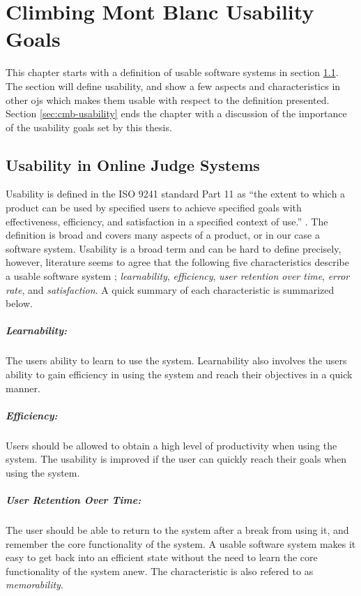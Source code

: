 \chapter{Climbing Mont Blanc Usability Goals}
\label{ch:design}
This chapter starts with a definition of usable software systems in section \ref{sec:usability-def}. The section will define usability, and show a few aspects and characteristics in other \glspl{oj} which makes them usable with respect to the definition presented. Section \ref{sec:cmb-usability} ends the chapter with a discussion of the importance of the usability goals set by this thesis.

\section{Usability in Online Judge Systems}
\label{sec:usability-def}
Usability is defined in the ISO 9241 standard Part 11 as ``the extent to which a product can be used by specified users to achieve specified goals with effectiveness, efficiency, and satisfaction in a specified context of use.'' \cite{ISO1998}. The definition is broad and covers many aspects of a product, or in our case a software system. Usability is a broad term and can be hard to define precisely, however, literature seems to agree that the following five characteristics describe a usable software system  \cite{holzinger2005, ferre2001}; \textit{learnability}, \textit{efficiency}, \textit{user retention over time}, \textit{error rate}, and \textit{satisfaction}. A quick summary of each characteristic is summarized below.

\paragraph*{Learnability:} The users ability to learn to use the system. Learnability also involves the users ability to gain efficiency in using the system and reach their objectives in a quick manner.

\paragraph*{Efficiency:} Users should be allowed to obtain a high level of productivity when using the system. The usability is improved if the user can quickly reach their goals when using the system.

\paragraph*{User Retention Over Time:} The user should be able to return to the system after a break from using it, and remember the core functionality of the system. A usable software system makes it easy to get back into an efficient state without the need to learn the core functionality of the system anew. The characteristic is also refered to as \textit{memorability}.

